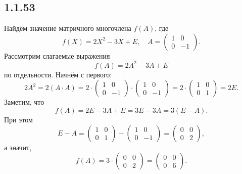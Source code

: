 \subsection{1.1.53}

Найдём значение матричного многочлена $f(A)$, где
\[
f(X)=2X^2-3X+E,\quad A=
\begin{pmatrix}
	1 & 0 \\
	0 & -1
\end{pmatrix}
.
\]
Рассмотрим слагаемые выражения
\[
f(A)=2A^2-3A+E
\]
по отдельности. Начнём с первого:
\[
2A^2=2(A\cdot A)=2\cdot
\begin{pmatrix}
	1 & 0 \\
	0 & -1
\end{pmatrix}
\cdot
\begin{pmatrix}
	1 & 0 \\
	0 & -1
\end{pmatrix}
=2\cdot
\begin{pmatrix}
	1 & 0 \\
	0 & 1
\end{pmatrix}
=2E.
\]
Заметим, что
\[
f(A)=2E-3A+E=3E-3A=3(E-A).
\]
При этом
\[
E-A=
\begin{pmatrix}
	1 & 0 \\
	0 & 1
\end{pmatrix}
-
\begin{pmatrix}
	1 & 0 \\
	0 & -1
\end{pmatrix}
=
\begin{pmatrix}
	0 & 0 \\
	0 & 2
\end{pmatrix},
\]
а значит,
\[
f(A)=3\cdot
\begin{pmatrix}
	0 & 0 \\
	0 & 2
\end{pmatrix}
=
\begin{pmatrix}
	0 & 0 \\
	0 & 6
\end{pmatrix}
.
\]